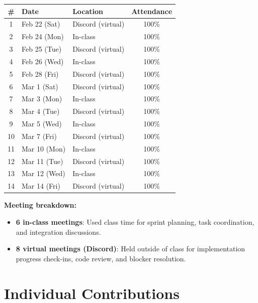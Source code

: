 \documentclass[11pt]{article}
\begin{document}
\begin{center}
\begin{tabularx}{\textwidth}{@{}clXc@{}}
\toprule
\textbf{\#} & \textbf{Date} & \textbf{Location} & \textbf{Attendance} \\
\midrule
1  & Feb 22 (Sat) & Discord (virtual)  & 100\% \\
2  & Feb 24 (Mon) & In-class           & 100\% \\
3  & Feb 25 (Tue) & Discord (virtual)  & 100\% \\
4  & Feb 26 (Wed) & In-class           & 100\% \\
5  & Feb 28 (Fri) & Discord (virtual)  & 100\% \\
6  & Mar 1 (Sat)  & Discord (virtual)  & 100\% \\
7  & Mar 3 (Mon)  & In-class           & 100\% \\
8  & Mar 4 (Tue)  & Discord (virtual)  & 100\% \\
9  & Mar 5 (Wed)  & In-class           & 100\% \\
10 & Mar 7 (Fri)  & Discord (virtual)  & 100\% \\
11 & Mar 10 (Mon) & In-class           & 100\% \\
12 & Mar 11 (Tue) & Discord (virtual)  & 100\% \\
13 & Mar 12 (Wed) & In-class           & 100\% \\
14 & Mar 14 (Fri) & Discord (virtual)  & 100\% \\
\bottomrule
\end{tabularx}
\end{center}

\textbf{Meeting breakdown:}
\begin{itemize}[leftmargin=1.5em]
    \item \textbf{6 in-class meetings}: Used class time for sprint planning, task coordination, and integration discussions.
    \item \textbf{8 virtual meetings (Discord)}: Held outside of class for implementation progress check-ins, code review, and blocker resolution.
\end{itemize}

\section{Individual Contributions}
\end{document}
